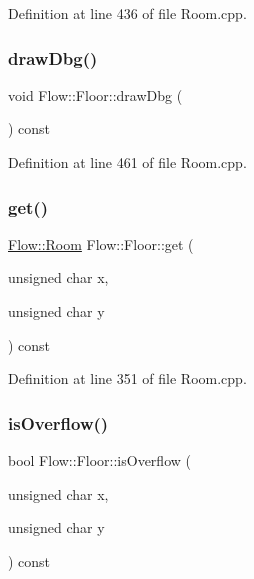 Definition at line 436 of file Room.\+cpp.

\hypertarget{class_flow_1_1_floor_a9cab7af772e3b3a12f289b0942e870f1}{}\label{class_flow_1_1_floor_a9cab7af772e3b3a12f289b0942e870f1} 
\subsubsection{\texorpdfstring{draw\+Dbg()}{drawDbg()}}
{\footnotesize\ttfamily void Flow\+::\+Floor\+::draw\+Dbg (\begin{DoxyParamCaption}{ }\end{DoxyParamCaption}) const}



Definition at line 461 of file Room.\+cpp.

\hypertarget{class_flow_1_1_floor_a167e37ebab4947cdc191890647ff99e6}{}\label{class_flow_1_1_floor_a167e37ebab4947cdc191890647ff99e6} 
\subsubsection{\texorpdfstring{get()}{get()}}
{\footnotesize\ttfamily \hyperlink{class_flow_1_1_room}{Flow\+::\+Room} Flow\+::\+Floor\+::get (\begin{DoxyParamCaption}\item[{unsigned char}]{x,  }\item[{unsigned char}]{y }\end{DoxyParamCaption}) const}



Definition at line 351 of file Room.\+cpp.

\hypertarget{class_flow_1_1_floor_a649041679a73f38cf92ef7082c885795}{}\label{class_flow_1_1_floor_a649041679a73f38cf92ef7082c885795} 
\subsubsection{\texorpdfstring{is\+Overflow()}{isOverflow()}}
{\footnotesize\ttfamily bool Flow\+::\+Floor\+::is\+Overflow (\begin{DoxyParamCaption}\item[{unsigned char}]{x,  }\item[{unsigned char}]{y }\end{DoxyParamCaption}) const}



